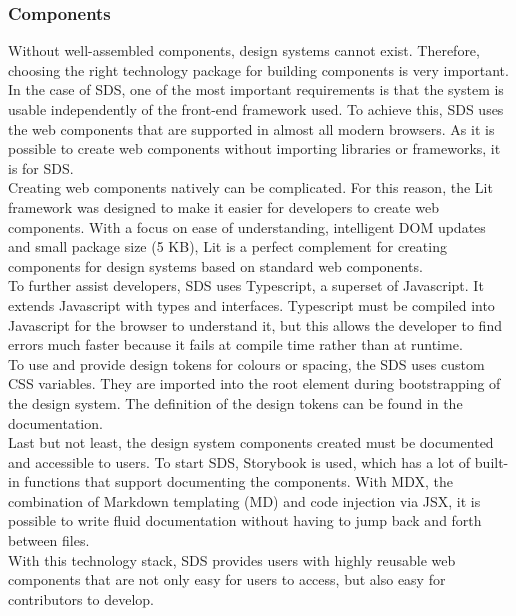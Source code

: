 \subsubsection*{Components} \label{sds-component}
Without well-assembled components, design systems cannot exist. Therefore, choosing the right technology package for building components is very important. 
In the case of \ac{SDS}, one of the most important requirements is that the system is usable independently of the front-end framework used. To achieve this, \ac{SDS} uses the web components that are supported in almost all modern browsers. As it is possible to create web components without importing libraries or frameworks, it is for \ac{SDS}. \citep{mdn_web_component_nodate} \\
Creating web components natively can be complicated. For this reason, the Lit framework was designed to make it easier for developers to create web components. With a focus on ease of understanding, intelligent DOM updates and small package size (5 KB), Lit is a perfect complement for creating components for design systems based on standard web components. \citep{lit_nodate} \\
To further assist developers, \ac{SDS} uses Typescript, a superset of Javascript. It extends Javascript with types and interfaces. Typescript must be compiled into Javascript for the browser to understand it, but this allows the developer to find errors much faster because it fails at compile time rather than at runtime. \citep{microsoft_typescript_nodate} \\
To use and provide design tokens for colours or spacing, the \ac{SDS} uses custom CSS variables. They are imported into the root element during bootstrapping of the design system. The definition of the design tokens can be found in the documentation. \citep{mdn_css_vars_nodate} \\
Last but not least, the design system components created must be documented and accessible to users. To start \ac{SDS}, Storybook is used, which has a lot of built-in functions that support documenting the components. With MDX, the combination of Markdown templating (MD) and code injection via JSX, it is possible to write fluid documentation without having to jump back and forth between files. \citep{otander_markdown_2017} \\
With this technology stack, \ac{SDS} provides users with highly reusable web components that are not only easy for users to access, but also easy for contributors to develop. 
